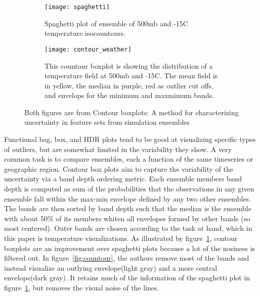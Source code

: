 \documentclass[../main.tex]{subfiles}
\begin{document}
\begin{figure}
  \begin{subfigure}{\textwidth}
    \centering
    \texttt{[image: spaghetti]}
    \caption{Spaghetti plot of ensemble of 500mb and -15C temperature isocountours.}
    \label{fig:spaghetti}
    \end{subfigure}

    \bigskip
    \begin{subfigure}{\textwidth}
    \centering
    \texttt{[image: contour\_weather]}
    \caption{This countour boxplot is showing the distribution of a temperature field at 500mb and -15C. The mean field is in yellow, the median in purple, red as outlier cut offs, and envelops for the minimum and maxmimum bands.}
    \label{fig:contour}
    \end{subfigure}
    \caption{Both figures are from Contour boxplots: A method for characterizing uncertainty in feature sets from simulation ensembles\cite{whitaker_contour_2013}}
\end{figure}

Functional bag, box, and HDR plots \cite{rob_j._hyndman_rainbow_2010, sun_functional_2011} tend to be good at visualizing specific types of outliers, but are somewhat limited in the variability they show. A very common task is to compare ensembles, each a function of the same timeseries or geographic region. Contour box plots\cite{whitaker_contour_2013} aim to capture the variability of the
uncertainty via a band depth ordering metric. Each ensemble members band depth
is computed as sum of the probabilities that the observations in any given
ensemble fall within the max-min envelope defined by any two other
ensembles. The bands are then sorted by band depth such that the median is the
ensemble with about 50\% of its members whiten all envelopes formed by other
bands (so most centered). Outer bands are chosen according to the task at
hand, which in this paper is temperature visualizations. As illustrated by figure~\ref{fig:spaghetti}, contour boxplots are an improvement over spaghetti plots \cite{luo_visualizing_2003, whitaker_contour_2013} because a lot of the nosiness is filtered out.  In figure~\ref{fig:countour}, the authors remove most of the bands and instead visualize an outlying envelope(light gray) and a more central envelope(dark gray). It retains much of the information of the spaghetti plot in figure~\ref{fig:spaghetti}, but removes the visual noise of the lines.
\end{document}
